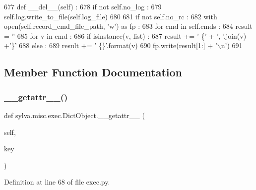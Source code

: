 \begin{DoxyCode}
677   \textcolor{keyword}{def }\_\_del\_\_(self) :
678     \textcolor{keywordflow}{if} \textcolor{keywordflow}{not} self.no\_log :
679       self.log.write\_to\_file(self.log\_file)
680 
681     \textcolor{keywordflow}{if} \textcolor{keywordflow}{not} self.no\_rc :
682       with open(self.record\_cmd\_file\_path, \textcolor{stringliteral}{'w'}) \textcolor{keyword}{as} fp :
683         \textcolor{keywordflow}{for} cmd \textcolor{keywordflow}{in} self.cmds :
684           result = \textcolor{stringliteral}{''}
685           \textcolor{keywordflow}{for} v \textcolor{keywordflow}{in} cmd :
686             \textcolor{keywordflow}{if} isinstance(v, list) :
687               result += \textcolor{stringliteral}{' \{'} + \textcolor{stringliteral}{', '}.join(v) +\textcolor{stringliteral}{'\}'}
688             \textcolor{keywordflow}{else} :
689               result += \textcolor{stringliteral}{' \{\}'}.format(v)
690           fp.write(result[1:] + \textcolor{stringliteral}{'\(\backslash\)n'})
691 
\end{DoxyCode}


\subsection{Member Function Documentation}
\mbox{\label{classsylva_1_1misc_1_1exec_1_1_dict_object_a194306589e55ae82911d017462eb5f8e}} 
\subsubsection{\texorpdfstring{\+\_\+\+\_\+getattr\+\_\+\+\_\+()}{\_\_getattr\_\_()}}
{\footnotesize\ttfamily def sylva.\+misc.\+exec.\+Dict\+Object.\+\_\+\+\_\+getattr\+\_\+\+\_\+ (\begin{DoxyParamCaption}\item[{}]{self,  }\item[{}]{key }\end{DoxyParamCaption})\hspace{0.3cm}{\ttfamily [inherited]}}



Definition at line 68 of file exec.\+py.



